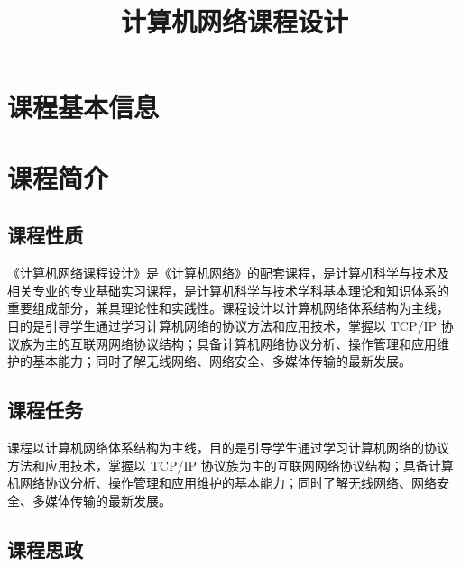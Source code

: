 \documentclass{swfusyllabus}
\title{计算机网络课程设计}
\begin{document}
\maketitle{}

\section{课程基本信息}

\basicinfo{}

\section{课程简介}

\subsection{课程性质}

《计算机网络课程设计》是《计算机网络》的配套课程，是计算机科学与技术及
相关专业的专业基础实习课程，是计算机科学与技术学科基本理论和知识体系的
重要组成部分，兼具理论性和实践性。课程设计以计算机网络体系结构为主线，
目的是引导学生通过学习计算机网络的协议方法和应用技术，掌握以 TCP/IP 协
议族为主的互联网网络协议结构；具备计算机网络协议分析、操作管理和应用维
护的基本能力；同时了解无线网络、网络安全、多媒体传输的最新发展。

\subsection{课程任务}




课程以计算机网络体系结构为主线，目的是引导学生通过学习计算机网络的协议
方法和应用技术，掌握以 TCP/IP 协议族为主的互联网网络协议结构；具备计算
机网络协议分析、操作管理和应用维护的基本能力；同时了解无线网络、网络安
全、多媒体传输的最新发展。

\subsection{课程思政}
\end{document}
